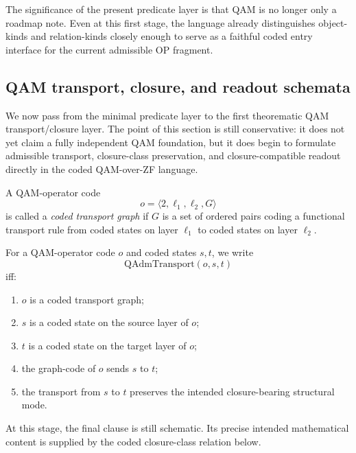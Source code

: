 \begin{remark}
The significance of the present predicate layer is that QAM is no longer only a roadmap note. Even at this first stage, the language already distinguishes object-kinds and relation-kinds closely enough to serve as a faithful coded entry interface for the current admissible OP fragment.
\end{remark}



\subsection*{QAM transport, closure, and readout schemata}

We now pass from the minimal predicate layer to the first theorematic QAM transport/closure layer. The point of this section is still conservative: it does not yet claim a fully independent QAM foundation, but it does begin to formulate admissible transport, closure-class preservation, and closure-compatible readout directly in the coded QAM-over-ZF language.

\begin{definition}
A QAM-operator code
\[
o=\langle 2,\ell_1,\ell_2,G\rangle
\]
is called a \emph{coded transport graph} if $G$ is a set of ordered pairs coding a functional transport rule from coded states on layer $\ell_1$ to coded states on layer $\ell_2$.
\end{definition}

\begin{definition}
For a QAM-operator code $o$ and coded states $s,t$, we write
\[
\mathrm{QAdmTransport}(o,s,t)
\]
iff:
\begin{enumerate}
\item $o$ is a coded transport graph;
\item $s$ is a coded state on the source layer of $o$;
\item $t$ is a coded state on the target layer of $o$;
\item the graph-code of $o$ sends $s$ to $t$;
\item the transport from $s$ to $t$ preserves the intended closure-bearing structural mode.
\end{enumerate}
\end{definition}

\begin{remark}
At this stage, the final clause is still schematic. Its precise intended mathematical content is supplied by the coded closure-class relation below.
\end{remark}

